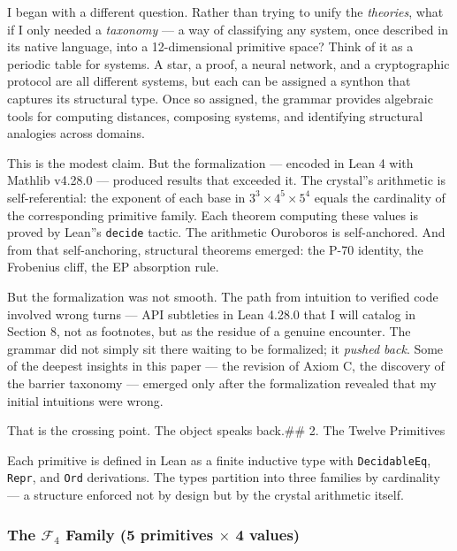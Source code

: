 \documentclass[12pt,a4paper]{article}
\begin{document}
I began with a different question. Rather than trying to unify the \emph{theories}, what if I only needed a \emph{taxonomy} --- a way of classifying any system, once described in its native language, into a 12-dimensional primitive space? Think of it as a periodic table for systems. A star, a proof, a neural network, and a cryptographic protocol are all different systems, but each can be assigned a synthon that captures its structural type. Once so assigned, the grammar provides algebraic tools for computing distances, composing systems, and identifying structural analogies across domains.

This is the modest claim. But the formalization --- encoded in Lean 4 with Mathlib v4.28.0 --- produced results that exceeded it. The crystal''s arithmetic is self-referential: the exponent of each base in $3^3 \times 4^5 \times 5^4$ equals the cardinality of the corresponding primitive family. Each theorem computing these values is proved by Lean''s \texttt{decide} tactic. The arithmetic Ouroboros is self-anchored. And from that self-anchoring, structural theorems emerged: the P-70 identity, the Frobenius cliff, the EP absorption rule.

But the formalization was not smooth. The path from intuition to verified code involved wrong turns --- API subtleties in Lean 4.28.0 that I will catalog in Section 8, not as footnotes, but as the residue of a genuine encounter. The grammar did not simply sit there waiting to be formalized; it \emph{pushed back}. Some of the deepest insights in this paper --- the revision of Axiom C, the discovery of the barrier taxonomy --- emerged only after the formalization revealed that my initial intuitions were wrong.

That is the crossing point. The object speaks back.\#\# 2. The Twelve Primitives

Each primitive is defined in Lean as a finite inductive type with \texttt{DecidableEq}, \texttt{Repr}, and \texttt{Ord} derivations. The types partition into three families by cardinality --- a structure enforced not by design but by the crystal arithmetic itself.

\subsubsection{The $\mathcal{F}_4$ Family (5 primitives $\times$ 4 values)}
\end{document}
